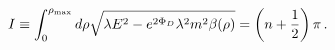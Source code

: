 \begin{equation}
I \equiv \int_0^{\rho_{\rm max}} d\rho \sqrt{\lambda E^2 - e^{2
\Phi_D} \lambda^2 m^2 \beta(\rho)}= \left(n+\frac{1}{2}\right)\pi
\,.
\end{equation}

